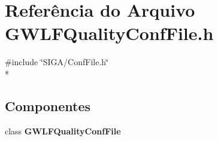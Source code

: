 \section{Referência do Arquivo G\+W\+L\+F\+Quality\+Conf\+File.\+h}
\label{_g_w_l_f_quality_conf_file_8h}
{\ttfamily \#include \char`\"{}S\+I\+G\+A/\+Conf\+File.\+h\char`\"{}}\\*
\subsection*{Componentes}
\begin{DoxyCompactItemize}
\item 
class {\bf G\+W\+L\+F\+Quality\+Conf\+File}
\end{DoxyCompactItemize}
